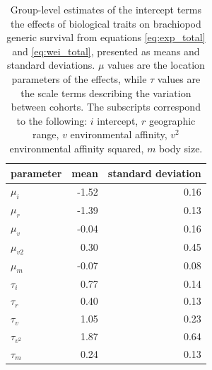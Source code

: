 \documentclass{article}
\begin{document}
\begin{table}
  \centering
  \begin{tabular}{ l r r }
    \hline
    parameter & mean & standard deviation \\ 
    \hline
    \(\mu_{i}\) & -1.52 & 0.16 \\ 
    \(\mu_{r}\) & -1.39 & 0.13 \\ 
    \(\mu_{v}\) & -0.04 & 0.16 \\ 
    \(\mu_{v2}\) & 0.30 & 0.45 \\ 
    \(\mu_{m}\) & -0.07 & 0.08 \\ 
    \(\tau_{i}\) & 0.77 & 0.14 \\ 
    \(\tau_{r}\) & 0.40 & 0.13 \\ 
    \(\tau_{v}\) & 1.05 & 0.23 \\ 
    \(\tau_{v^{2}}\) & 1.87 & 0.64 \\ 
    \(\tau_{m}\) & 0.24 & 0.13 \\ 
    \hline
  \end{tabular}
  \caption{Group-level estimates of the intercept terms the effects of biological traits on brachiopod generic survival from equations \ref{eq:exp_total} and \ref{eq:wei_total}, presented as means and standard deviations. \(\mu\) values are the location parameters of the effects, while \(\tau\) values are the scale terms describing the variation between cohorts. The subscripts correspond to the following: \(i\) intercept, \(r\) geographic range, \(v\) environmental affinity, \(v^{2}\) environmental affinity squared, \(m\) body size.}
  \label{tab:param}
\end{table}
\end{document}
